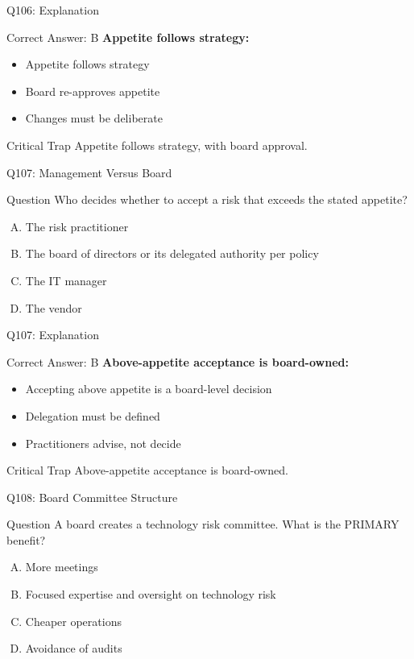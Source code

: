 \documentclass{beamer}
\begin{document}
	\begin{frame}{Q106: Explanation}
		\begin{block}{Correct Answer: B}
			\textbf{Appetite follows strategy:}
			\begin{itemize}
				\item Appetite follows strategy
				\item Board re-approves appetite
				\item Changes must be deliberate
			\end{itemize}
		\end{block}
		\begin{alertblock}{Critical Trap}
			Appetite follows strategy, with board approval.
		\end{alertblock}
	\end{frame}
	
	\begin{frame}{Q107: Management Versus Board}
		\begin{block}{Question}
			Who decides whether to accept a risk that exceeds the stated appetite?
		\end{block}
		\begin{enumerate}[(A)]
			\item The risk practitioner
			\item The board of directors or its delegated authority per policy
			\item The IT manager
			\item The vendor
		\end{enumerate}
	\end{frame}
	
	\begin{frame}{Q107: Explanation}
		\begin{block}{Correct Answer: B}
			\textbf{Above-appetite acceptance is board-owned:}
			\begin{itemize}
				\item Accepting above appetite is a board-level decision
				\item Delegation must be defined
				\item Practitioners advise, not decide
			\end{itemize}
		\end{block}
		\begin{alertblock}{Critical Trap}
			Above-appetite acceptance is board-owned.
		\end{alertblock}
	\end{frame}
	
	\begin{frame}{Q108: Board Committee Structure}
		\begin{block}{Question}
			A board creates a technology risk committee. What is the PRIMARY benefit?
		\end{block}
		\begin{enumerate}[(A)]
			\item More meetings
			\item Focused expertise and oversight on technology risk
			\item Cheaper operations
			\item Avoidance of audits
		\end{enumerate}
	\end{frame}
	
\end{document}
